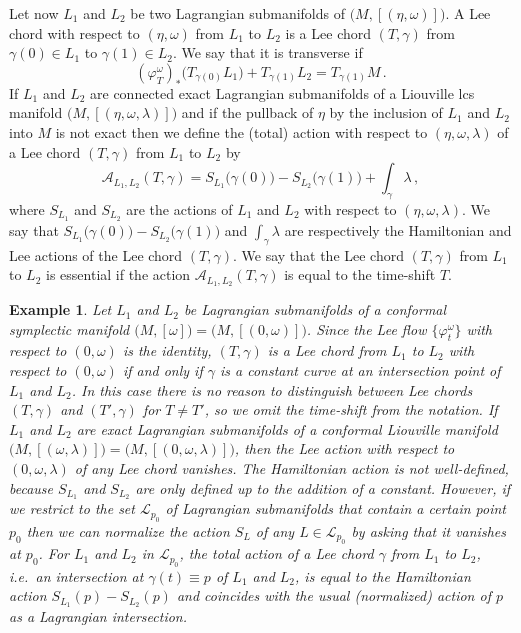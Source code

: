 \documentclass{amsart}
\newtheorem{example}[thm]{Example}
\theoremstyle{remark}
\begin{document}
Let now $L_1$ and $L_2$ be two Lagrangian submanifolds
of $\big(M, [(\eta, \omega)]\big)$.
A Lee chord with respect to $(\eta, \omega)$
from $L_1$ to $L_2$
is a Lee chord $(T, \gamma)$
from $\gamma(0) \in L_1$ to $\gamma(1) \in L_2$.
We say that it is transverse if
\[
(\varphi_T^{\omega})_{\ast} \big( T_{\gamma(0)}L_1 \big) + T_{\gamma(1)}L_2
= T_{\gamma(1)} M \,.
\]
If $L_1$ and $L_2$ are connected exact Lagrangian submanifolds
of a Liouville lcs manifold $\big(M, [(\eta, \omega, \lambda)]\big)$
and if the pullback of $\eta$ by the inclusion of $L_1$ and $L_2$ into $M$
is not exact
then we define the (total) action
with respect to $(\eta, \omega, \lambda)$
of a Lee chord $(T, \gamma)$
from $L_1$ to $L_2$
by
\[
\mathcal{A}_{L_1, L_2} (T, \gamma)
= S_{L_1} \big(\gamma(0)\big) - S_{L_2} \big(\gamma(1)\big) + \int_{\gamma} \lambda \,,
\]
where $S_{L_1}$ and $S_{L_2}$ are the actions of $L_1$ and $L_2$
with respect to $(\eta, \omega, \lambda)$.
We say that $S_{L_1} \big(\gamma(0)\big) - S_{L_2} \big(\gamma(1)\big)$
and $\int_{\gamma} \lambda$ are respectively
the Hamiltonian and Lee actions
of the Lee chord $(T, \gamma)$.
We say that the Lee chord $(T, \gamma)$ from $L_1$ to $L_2$
is essential if the action $\mathcal{A}_{L_1, L_2} (T, \gamma)$
is equal to the time-shift $T$.

\begin{example}\label{example: action Lee chors symplectic}
Let $L_1$ and $L_2$ be Lagrangian submanifolds
of a conformal symplectic manifold
$\big(M, [\omega]\big) = \big(M, [(0, \omega)]\big)$.
Since the Lee flow $\{\varphi_t^{\omega}\}$ with respect to $(0, \omega)$
is the identity,
$(T, \gamma)$ is a Lee chord from $L_1$ to $L_2$
with respect to $(0, \omega)$
if and only if $\gamma$ is a constant curve
at an intersection point of $L_1$ and $L_2$.
In this case there is no reason
to distinguish between Lee chords
$(T, \gamma)$ and $(T', \gamma)$ for $T \neq T'$,
so we omit the time-shift from the notation.
If $L_1$ and $L_2$ are exact Lagrangian submanifolds
of a conformal Liouville manifold
$\big(M, [(\omega, \lambda)]\big) = \big(M, [(0, \omega, \lambda)]\big)$,
then the Lee action with respect to $(0, \omega, \lambda)$
of any Lee chord vanishes.
The Hamiltonian action is not well-defined,
because $S_{L_1}$ and $S_{L_2}$ are only defined
up to the addition of a constant.
However,
if we restrict to the set $\mathcal{L}_{p_0}$
of Lagrangian submanifolds that contain a certain point $p_0$
then we can normalize the action $S_L$
of any $L \in \mathcal{L}_{p_0}$
by asking that it vanishes at $p_0$.
For $L_1$ and $L_2$ in $\mathcal{L}_{p_0}$,
the total action of a Lee chord $\gamma$ from $L_1$ to $L_2$,
i.e.\ an intersection at $\gamma(t) \equiv p$ of $L_1$ and $L_2$,
is equal to the Hamiltonian action $S_{L_1} (p) - S_{L_2} (p)$
and coincides with the usual (normalized) action of $p$
as a Lagrangian intersection.
\end{example}
\end{document}
